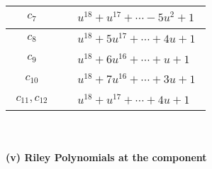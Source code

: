 \documentclass[1p]{elsarticle_modified}
\theoremstyle{definition}
\begin{document}
\begin{tabular}{m{50pt}|m{274pt}}
\hline $$\begin{aligned}c_{7}\end{aligned}$$&$\begin{aligned}
&u^{18}+u^{17}+\cdots-5 u^2+1
\end{aligned}$\\
\hline $$\begin{aligned}c_{8}\end{aligned}$$&$\begin{aligned}
&u^{18}+5 u^{17}+\cdots+4 u+1
\end{aligned}$\\
\hline $$\begin{aligned}c_{9}\end{aligned}$$&$\begin{aligned}
&u^{18}+6 u^{16}+\cdots+u+1
\end{aligned}$\\
\hline $$\begin{aligned}c_{10}\end{aligned}$$&$\begin{aligned}
&u^{18}+7 u^{16}+\cdots+3 u+1
\end{aligned}$\\
\hline $$\begin{aligned}c_{11},c_{12}\end{aligned}$$&$\begin{aligned}
&u^{18}+u^{17}+\cdots+4 u+1
\end{aligned}$\\
\hline
\end{tabular}\\~\\
\newpage\renewcommand{\arraystretch}{1}
\flushleft \textbf{(v) Riley Polynomials at the component}\newline \\
\end{document}

